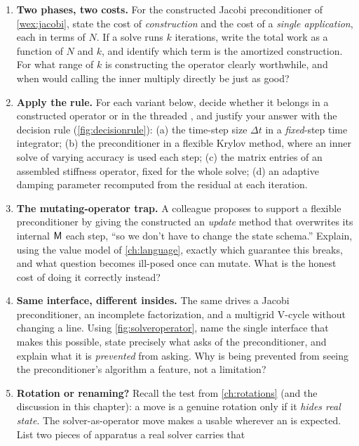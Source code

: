 \exercisessection
\begin{enumerate}[nosep]
  \item \textbf{Two phases, two costs.} For the constructed Jacobi preconditioner of
  \cref{wex:jacobi}, state the cost of \emph{construction} and the cost of a
  \emph{single application}, each in terms of $N$. If a solve runs $k$ iterations,
  write the total work as a function of $N$ and $k$, and identify which term is the
  amortized construction. For what range of $k$ is constructing the operator clearly
  worthwhile, and when would calling the inner multiply directly be just as good?
  \item \textbf{Apply the rule.} For each variant below, decide whether it belongs in a
  constructed operator or in the threaded , and justify your answer with
  the decision rule (\cref{fig:decisionrule}): (a) the time-step size $\Delta t$ in a
  \emph{fixed}-step time integrator; (b) the preconditioner in a flexible Krylov
  method, where an inner solve of varying accuracy is used each step; (c) the matrix
  entries of an assembled stiffness operator, fixed for the whole solve; (d) an
  adaptive damping parameter recomputed from the residual at each iteration.
  \item \textbf{The mutating-operator trap.} A colleague proposes to support a flexible
  preconditioner by giving the constructed  an \emph{update} method that
  overwrites its internal $\mathsf{M}$ each step, ``so we don't have to change the state
  schema.'' Explain, using the value model of \cref{ch:language}, exactly which
  guarantee this breaks, and what question becomes ill-posed once  can mutate.
  What is the honest cost of doing it correctly instead?
  \item \textbf{Same interface, different insides.} The same  drives a
  Jacobi preconditioner, an incomplete factorization, and a multigrid V-cycle without
  changing a line. Using \cref{fig:solveroperator}, name the single interface that
  makes this possible, state precisely what  asks of the preconditioner,
  and explain what it is \emph{prevented} from asking. Why is being prevented from
  seeing the preconditioner's algorithm a feature, not a limitation?
  \item \textbf{Rotation or renaming?} Recall the test from \cref{ch:rotations} (and
  the discussion in this chapter): a move is a genuine rotation only if it \emph{hides
  real state}. The solver-as-operator move makes a  usable wherever an
   is expected. List two pieces of apparatus a real solver carries that

\end{enumerate}
